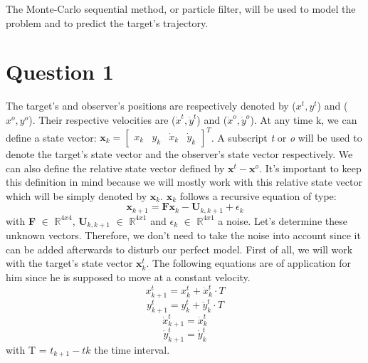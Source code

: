 \documentclass[a4paper,12pt]{report}
\begin{document}
The Monte-Carlo sequential method, or particle filter, will be used to model the problem and to predict the target's trajectory.   

\chapter*{Question 1}

The target's and observer's positions are respectively denoted by ($x^{t},y^{t}$) and ($x^{o},y^{o}$). Their respective velocities are ($\dot{x}^{t},\dot{y}^{t}$) and ($\dot{x}^{o},\dot{y}^{o}$). At any time k, we can define a state vector:
$\textbf{x}_{k} = [
   \begin{array}{cccc}
      x_{k} & y_{k} & \dot{x}_{k} & \dot{y}_{k}
   \end{array}
]^{T}$. A subscript \textit{t} or \textit{o} will be used to denote the target's state vector and the observer's state vector respectively. We can also define the relative state vector defined by $\textbf{x}^{t} - \textbf{x}^{o}$. It's important to keep this definition in mind because we will mostly work with this relative state vector which will be simply denoted by $\textbf{x}_{k}$. $\textbf{x}_{k}$ follows a recursive equation of type:\\
$$\textbf{x}_{k+1} = \textbf{F}\textbf{x}_{k} - \textbf{U}_{k,k+1} + \textbf{$\epsilon$}_{k}$$ with \textbf{F} $\in$ $\mathbb{R}^{4x4}$, $\textbf{U}_{k,k+1}$ $\in$ $\mathbb{R}^{4x1}$ and $\textbf{$\epsilon$}_{k}$ $\in$ $\mathbb{R}^{4x1}$ a noise. Let's determine these unknown vectors. Therefore, we don't need to take the noise into account since it can be added afterwards to disturb our perfect model. First of all, we will work with the target's state vector $\textbf{x}^{t}_{k}$. The following equations are of application for him since he is supposed to move at a constant velocity.
\begin{equation*}
x^{t}_{k+1} = x^{t}_{k} + \dot{x}^{t}_{k} \cdot T 
\end{equation*}    
\begin{equation*}
y^{t}_{k+1} = y^{t}_{k} + \dot{y}^{t}_{k} \cdot T 
\end{equation*}   
\begin{equation*}
\dot{x}^{t}_{k+1} = \dot{x}^{t}_{k} 
\end{equation*}
\begin{equation*}
\dot{y}^{t}_{k+1} = \dot{y}^{t}_{k} 
\end{equation*}
with T = $t_{k+1}-t{k}$ the time interval.\\
\end{document}
